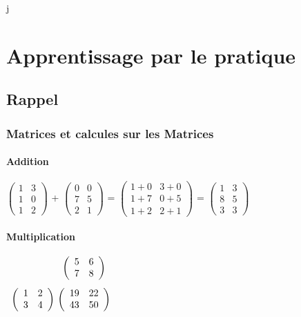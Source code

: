 j\chapter{Apprentissage par le pratique}
\pagebreak

\section{Rappel}
\subsection{Matrices et calcules sur les Matrices}

\subsubsection{Addition}

$\left(\begin{array}{cc}
1 & 3 \\ 1 & 0 \\ 1 & 2 \end{array} \right)$
+
$\left(\begin{array}{cc}
0 & 0 \\ 7 & 5 \\ 2 & 1 \end{array} \right) $
=
$\left(\begin{array}{cc}
1+0 & 3+0 \\ 1+7 & 0+5 \\ 1+2 & 2+1 \end{array} \right) $
=
$\left(\begin{array}{cc}
1 & 3 \\ 8 & 5 \\ 3 & 3 \end{array} \right) $

\subsubsection{Multiplication}

$\begin{array}{c@{\ }c}
&
\left(\begin{array}{cc}
5 & 6 \\ 7 & 8 \end{array} \right) \\[0.5cm]
\left(\begin{array}{cc}
1 & 2 \\ 3 & 4 \end{array} \right)
&
\left(\begin{array}{cc}
19 & 22 \\ 43 & 50 \end{array} \right)
\end{array}$

